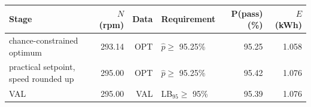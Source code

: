 \begin{tabular}{lrrlrr}
\toprule
Stage & $N$ (rpm) & Data & Requirement & P(pass) (\%) & $E$ (kWh) \\
\midrule
chance-constrained optimum & 293.14 & OPT & $\hat p \geq$ 95.25\% & 95.25 & 1.058 \\
practical setpoint, speed rounded up & 295.00 & OPT & $\hat p \geq$ 95.25\% & 95.42 & 1.076 \\
VAL & 295.00 & VAL & LB$_{95} \geq$ 95\% & 95.39 & 1.076 \\
\bottomrule
\end{tabular}
